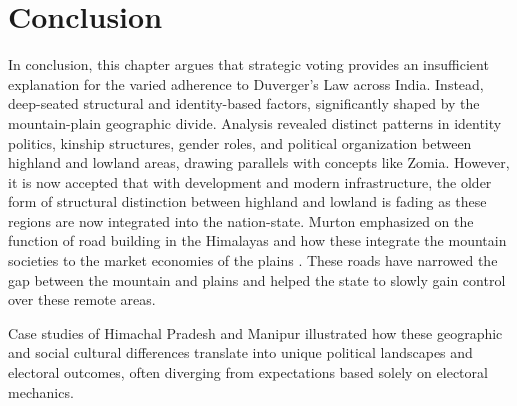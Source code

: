 \section{Conclusion}
\begin{sloppypar}
    
In conclusion, this chapter argues that strategic voting provides an insufficient explanation for the varied adherence to Duverger's Law across India. Instead, deep\hyp{}seated structural and identity\hyp{}based factors, significantly shaped by the mountain\hyp{}plain geographic divide. Analysis revealed distinct patterns in identity politics, kinship structures, gender roles, and political organization between highland and lowland areas, drawing parallels with concepts like Zomia. However, it is now accepted that with development and modern infrastructure, the older form of structural distinction between highland and lowland is fading as these regions are now integrated into the nation\hyp{}state. Murton emphasized on the function of road building in the Himalayas and how these integrate the mountain societies to the market economies of the plains \citep{murton2013himalayan}. These roads have narrowed the gap between the mountain and plains and helped the  state to slowly gain control over these remote areas.
\end{sloppypar}
Case studies of Himachal Pradesh and Manipur illustrated how these geographic and social cultural differences translate into unique political landscapes and electoral outcomes, often diverging from expectations based solely on electoral mechanics. 

